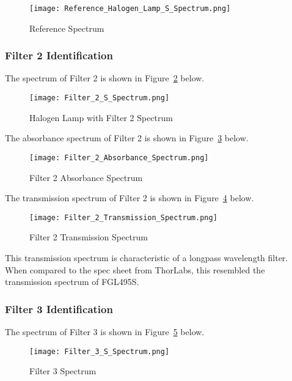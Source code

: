 \documentclass{article}
\begin{document}
\begin{figure} [h!]
    \centering
    \texttt{[image: Reference\_Halogen\_Lamp\_S\_Spectrum.png]}
    \caption{Reference Spectrum}
    \label{fig:filter 1 reference spectrum}
\end{figure}

\subsubsection{Filter 2 Identification}
The spectrum of Filter 2 is shown in Figure~\ref{fig:filter 2 S spectrum} below.

\begin{figure} [h!]
    \centering
    \texttt{[image: Filter\_2\_S\_Spectrum.png]}
    \caption{Halogen Lamp with Filter 2 Spectrum}
    \label{fig:filter 2 S spectrum}
\end{figure}

The absorbance spectrum of Filter 2 is shown in Figure~\ref{fig:filter 2 A spectrum} below.

\begin{figure} [h!]
    \centering
    \texttt{[image: Filter\_2\_Absorbance\_Spectrum.png]}
    \caption{Filter 2 Absorbance Spectrum}
    \label{fig:filter 2 A spectrum}
\end{figure}

The transmission spectrum of Filter 2 is shown in Figure~\ref{fig:filter 2 T spectrum} below.

\begin{figure} [h!]
    \centering
    \texttt{[image: Filter\_2\_Transmission\_Spectrum.png]}
    \caption{Filter 2 Transmission Spectrum}
    \label{fig:filter 2 T spectrum}
\end{figure}

This transmission spectrum is characteristic of a longpass wavelength filter. When compared to the spec sheet from ThorLabs, this resembled the transmission spectrum of FGL495S.

\subsubsection{Filter 3 Identification}
The spectrum of Filter 3 is shown in Figure~\ref{fig:filter 3 S spectrum} below.

\begin{figure} [h!]
    \centering
    \texttt{[image: Filter\_3\_S\_Spectrum.png]}
    \caption{Filter 3 Spectrum}
    \label{fig:filter 3 S spectrum}
\end{figure}
\end{document}
